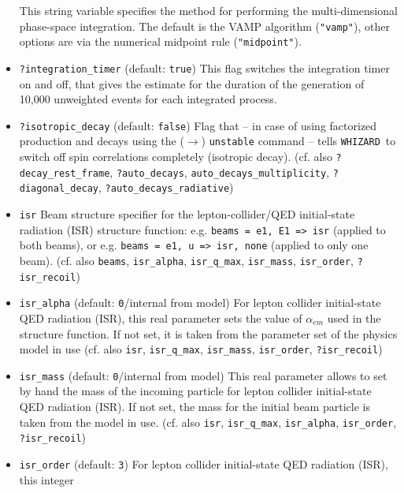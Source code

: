 \documentclass[12pt]{book}
\newcommand{\ttt}[1]{\texttt{#1}}
\newcommand{\whizard}{\texttt{WHIZARD}}
\begin{document}
\begin{itemize}
This string variable specifies the method for performing the
multi-dimensional phase-space integration. The default is the VAMP
algorithm (\ttt{"vamp"}), other options are via the numerical
midpoint rule (\ttt{"midpoint"}).
\item
\ttt{?integration\_timer} \qquad (default: \ttt{true}) \newline
This flag switches the integration timer on and off, that gives the
estimate for the duration of the generation of 10,000 unweighted
events for each integrated process. 
\item
\ttt{?isotropic\_decay} \qquad (default: \ttt{false}) \newline
Flag that -- in case of using factorized production and decays using
the ($\to$) \ttt{unstable} command -- tells \whizard\ to switch off
spin correlations completely (isotropic decay). (cf. also 
\ttt{?decay\_rest\_frame}, \ttt{?auto\_decays},
\ttt{auto\_decays\_multiplicity}, \ttt{?diagonal\_decay},
\ttt{?auto\_decays\_radiative}) 
\item
\ttt{isr} \newline
Beam structure specifier for the lepton-collider/QED initial-state
radiation (ISR) structure function: e.g. \ttt{beams = e1, E1 => isr}
(applied to both beams), or e.g. \ttt{beams = e1, u => isr, none}
(applied to only one beam). (cf. also \ttt{beams}, \ttt{isr\_alpha},
\ttt{isr\_q\_max}, \ttt{isr\_mass}, \ttt{isr\_order}, 
\ttt{?isr\_recoil})
\item
\ttt{isr\_alpha} \qquad (default: \ttt{0}/internal from model)
\newline
For lepton collider initial-state QED radiation (ISR), this real parameter
sets the value of $\alpha_{em}$ used in the structure function. If not
set, it is taken from the parameter set of the physics model in use
(cf. also \ttt{isr}, \ttt{isr\_q\_max}, \ttt{isr\_mass}, \ttt{isr\_order},
\ttt{?isr\_recoil})
\item
\ttt{isr\_mass} \qquad (default: \ttt{0}/internal from model) \newline 
This real parameter allows to set by hand the mass of the incoming
particle for lepton collider initial-state QED radiation (ISR). If not
set, the mass for the initial beam particle is taken from the model in
use. (cf. also \ttt{isr}, \ttt{isr\_q\_max}, \ttt{isr\_alpha},
\ttt{isr\_order}, \ttt{?isr\_recoil})
\item
\ttt{isr\_order} \qquad (default: \ttt{3}) \newline
For lepton collider initial-state QED radiation (ISR), this integer

\end{itemize}
\end{document}
